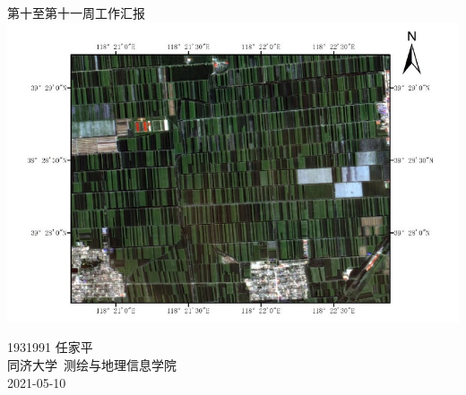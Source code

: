 \documentclass[a4paper, 12pt]{article}
\begin{document}
\begin{center}
    {\Huge 
        第十至第十一周工作汇报}\\[20pt]
    
    \includegraphics[scale=0.6]{pic/cover.jpg}  

    {\Large 
        1931991 任家平\\[12pt]
        同济大学~测绘与地理信息学院\\[12pt]
        2021-05-10}
\end{center}
\thispagestyle{empty}



\newpage
{}
\tableofcontents
\newpage
{}






\newpage
\nocite{*}


\end{document}
